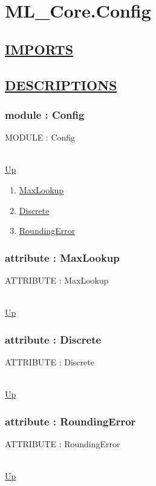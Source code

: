 \chapter*{ML\_Core.Config}
\hypertarget{ML_Core.Config}{}

\section*{\underline{IMPORTS}}

\section*{\underline{DESCRIPTIONS}}
\subsection*{module : Config}
\hypertarget{ecldoc:ML_Core.Config}{MODULE : Config} \\
\hyperlink{ecldoc:}{Up} \\
\par
\begin{enumerate}
\item \hyperlink{ecldoc:ml_core.config.maxlookup}{MaxLookup}
\item \hyperlink{ecldoc:ml_core.config.discrete}{Discrete}
\item \hyperlink{ecldoc:ml_core.config.roundingerror}{RoundingError}
\end{enumerate}
\subsection*{attribute : MaxLookup}
\hypertarget{ecldoc:ml_core.config.maxlookup}{ATTRIBUTE : MaxLookup} \\
\hyperlink{ecldoc:ML_Core.Config}{Up} \\
\par
\subsection*{attribute : Discrete}
\hypertarget{ecldoc:ml_core.config.discrete}{ATTRIBUTE : Discrete} \\
\hyperlink{ecldoc:ML_Core.Config}{Up} \\
\par
\subsection*{attribute : RoundingError}
\hypertarget{ecldoc:ml_core.config.roundingerror}{ATTRIBUTE : RoundingError} \\
\hyperlink{ecldoc:ML_Core.Config}{Up} \\
\par

